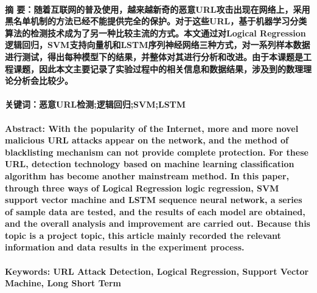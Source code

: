 \paragraph{\textbf{摘 要：}随着互联网的普及使用，越来越新奇的恶意URL攻击出现在网络上，采用黑名单机制的方法已经不能提供完全的保护。对于这些URL，基于机器学习分类算法的检测技术成为了另一种比较主流的方式。本文通过对Logical Regression逻辑回归，SVM支持向量机和LSTM序列神经网络三种方式，对一系列样本数据进行测试，得出每种模型下的结果，并整体对其进行分析和改进。由于本课题是工程课题，因此本文主要记录了实验过程中的相关信息和数据结果，涉及到的数理理论分析会比较少。}
\paragraph{\textbf{关键词：}恶意URL检测;逻辑回归;SVM;LSTM}
\paragraph{\textbf{Abstract:} With the popularity of the Internet, more and more novel malicious URL attacks appear on the network, and the method of blacklisting mechanism can not provide complete protection. For these URL, detection technology based on machine learning classification algorithm has become another mainstream method. In this paper, through three ways of Logical Regression logic regression, SVM support vector machine and LSTM sequence neural network, a series of sample data are tested, and the results of each model are obtained, and the overall analysis and improvement are carried out. Because this topic is a project topic, this article mainly recorded the relevant information and data results in the experiment process.}
\paragraph{\textbf{Keywords:} URL Attack Detection, Logical Regression, Support Vector Machine, Long Short Term}
\paragraph{} 